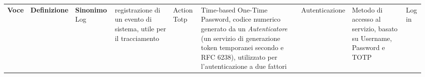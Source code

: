 \begin{center}

    \begin{tabularx}{\textwidth}
        {|c|>{\raggedright}X|l|}

        \hline {}
        \Large\textbf{Voce} & \Large\centering\textbf{Definizione}                                  & \Large\textbf{Sinonimo} %
        \n Log              &  registrazione di un evento di sistema, utile per il tracciamento & Action
        \n  Totp               & Time-based One-Time Password, codice numerico generato da un \textit{Autenticatore} (un servizio di generazione token temporanei secondo e RFC 6238), utilizzato per l'autenticazione a due fattori &
        \n  Autenticazione     & Metodo di accesso al servizio, basato su Username, Password e TOTP& Log in
        \n
    \end{tabularx}
\end{center}
